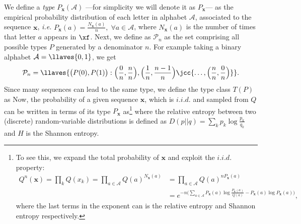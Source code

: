 We define a \textit{type} $P_\mathbf{x}(\mathcal{A})$ ---for simplicity we will denote it as $P_\mathbf{x}$--- as the empirical probability distribution of each letter in alphabet $\mathcal{A}$, associated to the
 sequence $\mathbf{x}$, \textit{i.e.} $P_\mathbf{x}(a) = \frac{N_\mathbf{x}(a)}{n},\; \forall a \in \mathcal{A}$, where $N_\mathbf{x}(a)$ is the number of times that letter $a$ appears in $\xf$.
Next, we define as $\mathcal{P}_n$ as the set comprising all possible types $P$ generated by a denominator $n$. %
For example taking a binary alphabet $\mathcal{A} = \llaves{0,1}$, we get
\begin{equation*}
\mathcal{P}_n = \llaves{\big(P(0), P(1)\big): \Big(\frac{0}{n},\frac{n}{n} \Big), \Big(\frac{1}{n},\frac{n-1}{n} \Big) \jcc{\ldots,  \Big(\frac{n}{n},\frac{0}{n} \Big)}}.
\end{equation*}
Since many sequences can lead to the same type, we define the type class $T(P)$ as
Now, the probability of a given sequence $\mathbf{x}$, which is $i.i.d.$ and sampled from $Q$ can be written in terms of its type $P_\mathbf{x}$ as\footnote{To see this, we expand the total probability of $\mathbf{x}$ and exploit the $i.i.d.$ property:
\begin{align*}
Q^{n}(\mathbf{x}) = \prod_k Q(x_k) =\prod_{a\in\mathcal{A}}Q(a)^{N_\mathbf{x}(a)} &= \prod_{a\in \mathcal{A}}Q(a)^{n P_\mathbf{x}(a)} \\
&= e^{-n \Big(\sum_{a\in\mathcal{A}} P_\mathbf{x}(a) \log{\frac{P_\mathbf{x}(a)}{Q(a)} - P_\mathbf{x}(a) \log{P_\mathbf{x}(a)}}\Big)},
\end{align*}
where the last terms in the exponent can is the relative entropy and Shannon entropy respectively.}
where the relative entropy between two (discrete) random-variable distributions is defined as $D(p||q)=\sum_k p_k \log{\frac{p_k}{q_k}}$ and $H$ is the Shannon entropy.%

